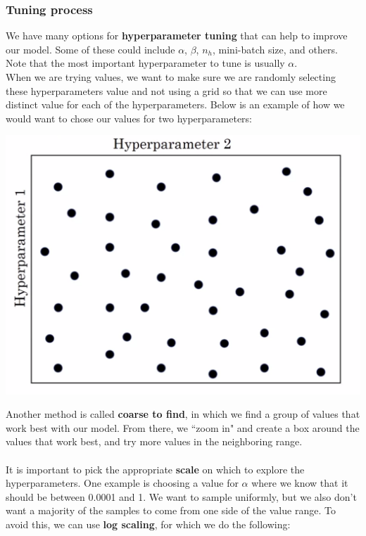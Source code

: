 \documentclass[11pt, a4paper]{article}
\begin{document}
\begin{spacing}{1.1}
	\subsubsection{Tuning process}
	We have many options for \textbf{hyperparameter tuning} that can help to improve our model. Some of these could include $\alpha$, $\beta$, $n_h$, mini-batch size, and others. Note that the most important hyperparameter to tune is usually $\alpha$. \vspace*{1mm} \\
	When we are trying values, we want to make sure we are randomly selecting these hyperparameters value and not using a grid so that we can use more distinct value for each of the hyperparameters. Below is an example of how we would want to chose our values for two hyperparameters:  
	\begin{center} \includegraphics[scale=.15]{tuning_graph} \\ \end{center}
	Another method is called \textbf{coarse to find}, in which we find a group of values that work best with our model. From there, we ``zoom in" and create a box around the values that work best, and try more values in the neighboring range. \\~\\
	It is important to pick the appropriate \textbf{scale} on which to explore the hyperparameters. One example is choosing a value for $\alpha$ where we know that it should be between 0.0001 and 1. We want to sample uniformly, but we also don't want a majority of the samples to come from one side of the value range. To avoid this, we can use \textbf{log scaling}, for which we do the following: \vspace*{.5mm} \\

\end{spacing}
\end{document}
